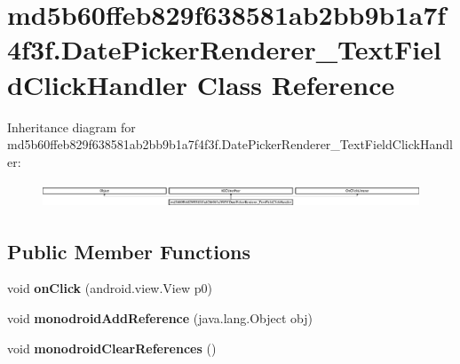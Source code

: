 \hypertarget{classmd5b60ffeb829f638581ab2bb9b1a7f4f3f_1_1DatePickerRenderer__TextFieldClickHandler}{}\section{md5b60ffeb829f638581ab2bb9b1a7f4f3f.\+Date\+Picker\+Renderer\+\_\+\+Text\+Field\+Click\+Handler Class Reference}
\label{classmd5b60ffeb829f638581ab2bb9b1a7f4f3f_1_1DatePickerRenderer__TextFieldClickHandler}
Inheritance diagram for md5b60ffeb829f638581ab2bb9b1a7f4f3f.\+Date\+Picker\+Renderer\+\_\+\+Text\+Field\+Click\+Handler\+:\begin{figure}[H]
\begin{center}
\leavevmode
\includegraphics[height=0.748163cm]{classmd5b60ffeb829f638581ab2bb9b1a7f4f3f_1_1DatePickerRenderer__TextFieldClickHandler}
\end{center}
\end{figure}
\subsection*{Public Member Functions}
\begin{DoxyCompactItemize}
\item 
\mbox{\label{classmd5b60ffeb829f638581ab2bb9b1a7f4f3f_1_1DatePickerRenderer__TextFieldClickHandler_a81aff3313b735fa41253b3b3077d3100}} 
void {\bfseries on\+Click} (android.\+view.\+View p0)
\item 
\mbox{\label{classmd5b60ffeb829f638581ab2bb9b1a7f4f3f_1_1DatePickerRenderer__TextFieldClickHandler_a2ddca20446ecf95867da36dea5970d47}} 
void {\bfseries monodroid\+Add\+Reference} (java.\+lang.\+Object obj)
\item 
\mbox{\label{classmd5b60ffeb829f638581ab2bb9b1a7f4f3f_1_1DatePickerRenderer__TextFieldClickHandler_a924d13da38fad223fa897e122738eb21}} 
void {\bfseries monodroid\+Clear\+References} ()
\end{DoxyCompactItemize}
